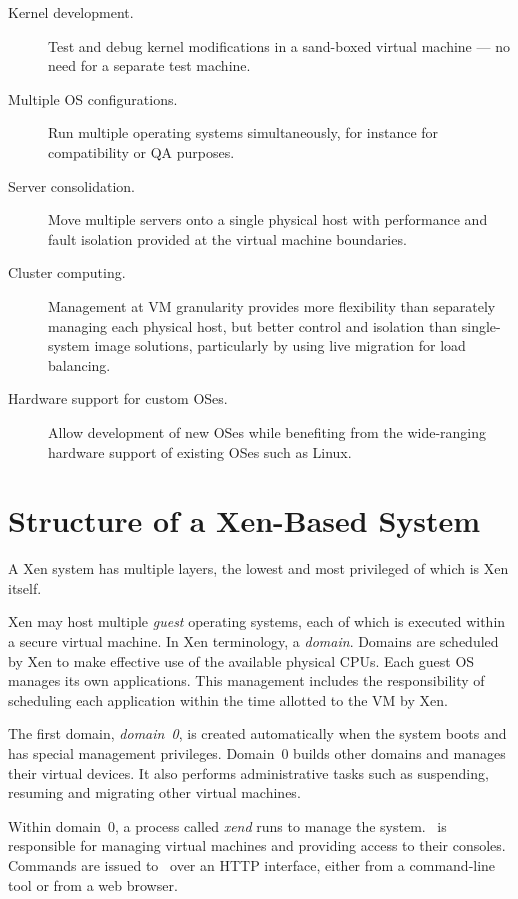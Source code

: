 \begin{description}
\item [Kernel development.] Test and debug kernel modifications in a
  sand-boxed virtual machine --- no need for a separate test machine.
\item [Multiple OS configurations.] Run multiple operating systems
  simultaneously, for instance for compatibility or QA purposes.
\item [Server consolidation.] Move multiple servers onto a single
  physical host with performance and fault isolation provided at the
  virtual machine boundaries.
\item [Cluster computing.] Management at VM granularity provides more
  flexibility than separately managing each physical host, but better
  control and isolation than single-system image solutions,
  particularly by using live migration for load balancing.
\item [Hardware support for custom OSes.] Allow development of new
  OSes while benefiting from the wide-ranging hardware support of
  existing OSes such as Linux.
\end{description}


\section{Structure of a Xen-Based System}

A Xen system has multiple layers, the lowest and most privileged of
which is Xen itself.

Xen may host multiple \emph{guest} operating systems, each of which is
executed within a secure virtual machine. In Xen terminology, a
\emph{domain}. Domains are scheduled by Xen to make effective use of the
available physical CPUs. Each guest OS manages its own applications.
This management includes the responsibility of scheduling each
application within the time allotted to the VM by Xen.

The first domain, \emph{domain~0}, is created automatically when the
system boots and has special management privileges. Domain~0 builds
other domains and manages their virtual devices. It also performs
administrative tasks such as suspending, resuming and migrating other
virtual machines.

Within domain~0, a process called \emph{xend} runs to manage the system.
\Xend\ is responsible for managing virtual machines and providing access
to their consoles. Commands are issued to \xend\ over an HTTP interface,
either from a command-line tool or from a web browser.


